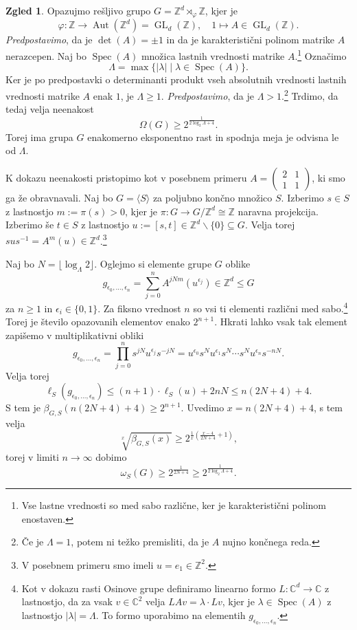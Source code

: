 \documentclass[11pt]{book}
\def\ZZ{\mathbb{Z}}
\def\CC{\mathbb{C}}
\DeclareMathOperator\Spec{Spec}
\DeclareMathOperator\Aut{Aut}
\DeclareMathOperator\GL{GL}
\theoremstyle{definition}
\theoremstyle{zgled}
\newtheorem*{zgled}{Zgled}
\theoremstyle{odprtproblem}
\theoremstyle{domacanaloga}
\theoremstyle{izrek}
\begin{document}
\begin{zgled}
Opazujmo rešljivo grupo $G = \ZZ^d \rtimes_\varphi \ZZ$, kjer je
\[
\varphi \colon \ZZ \to \Aut(\ZZ^d) = \GL_d(\ZZ),
\quad
1 \mapsto A \in \GL_d(\ZZ).
\]
{\em Predpostavimo}, da je $\det(A) = \pm 1$ in da je karakteristični polinom matrike $A$ nerazcepen. Naj bo $\Spec(A)$ množica lastnih vrednosti matrike $A$.\footnote{Vse lastne vrednosti so med sabo različne, ker je karakteristični polinom enostaven.} Označimo
\[
\Lambda = \max \{ |\lambda| \mid \lambda \in \Spec(A) \}.
\]
Ker je po predpostavki o determinanti produkt vseh absolutnih vrednosti lastnih vrednosti matrike $A$ enak $1$, je $\Lambda \geq 1$. {\em Predpostavimo}, da je $\Lambda > 1$.\footnote{Če je $\Lambda = 1$, potem ni težko premisliti, da je $A$ nujno končnega reda.} Trdimo, da tedaj velja neenakost
\[
\Omega(G) \geq 2^{\frac{1}{2 \log_2 \Lambda + 4}}.
\]
Torej ima grupa $G$ enakomerno eksponentno rast in spodnja meja je odvisna le od $\Lambda$.

K dokazu neenakosti pristopimo kot v posebnem primeru $A = \left( \begin{smallmatrix} 2 & 1 \\ 1 & 1 \end{smallmatrix} \right)$, ki smo ga že obravnavali. Naj bo $G = \langle S \rangle$ za poljubno končno množico $S$. Izberimo $s \in S$ z lastnostjo $m := \pi(s) > 0$, kjer je $\pi \colon G \to G/\ZZ^d \cong \ZZ$ naravna projekcija. Izberimo še $t \in S$ z lastnostjo $u := [s,t] \in \ZZ^d \backslash \{ 0 \} \subseteq G$. Velja torej $s u s^{-1} = A^m(u) \in \ZZ^d$.\footnote{V posebnem primeru smo imeli $u = e_1 \in \ZZ^2$.}

Naj bo $N = \lfloor \log_\Lambda 2 \rfloor$. Oglejmo si elemente grupe $G$ oblike
\[
g_{\epsilon_0, \dots, \epsilon_n} = \sum_{j = 0}^n A^{jNm}(u^{\epsilon_j}) \in \ZZ^d \leq G
\]
za $n \geq 1$ in $\epsilon_i \in \{0,1\}$. Za fiksno vrednost $n$ so vsi ti elementi različni med sabo.\footnote{Kot v dokazu rasti Osinove grupe definiramo linearno formo $L \colon \CC^d \to \CC$ z lastnostjo, da za vsak $v \in \CC^2$ velja $LAv = \lambda \cdot Lv$, kjer je $\lambda \in \Spec(A)$ z lastnostjo $|\lambda| = \Lambda$. To formo uporabimo na elementih $g_{\epsilon_0, \dots, \epsilon_n}$.} Torej je število opazovanih elementov enako $2^{n+1}$. Hkrati lahko vsak tak element zapišemo v multiplikativni obliki
\[
g_{\epsilon_0, \dots, \epsilon_n} = \prod_{j = 0}^n s^{jN} u^{\epsilon_j} s^{-jN}
= u^{\epsilon_0} s^N u^{\epsilon_1} s^N \cdots s^N u^{\epsilon_n} s^{-nN}.
\]
Velja torej
\[
\ell_S(g_{\epsilon_0, \dots, \epsilon_n}) \leq (n+1) \cdot \ell_S(u) + 2 n N
\leq n (2N + 4) + 4.
\]
S tem je $\beta_{G,S}(n(2N + 4) + 4) \geq 2^{n+1}$. Uvedimo $x = n(2N + 4) + 4$, s tem velja
\[
\sqrt[x]{\beta_{G,S}(x)} \geq 2^{\frac{1}{x} \left( \frac{x - 4}{2N + 4} + 1 \right)},
\]
torej v limiti $n \to \infty$ dobimo
\[
\omega_S(G) \geq 2^{\frac{1}{2N+4}} \geq 2^{\frac{1}{2 \log_2 \Lambda + 4}}.
\]
\end{zgled}
\end{document}
